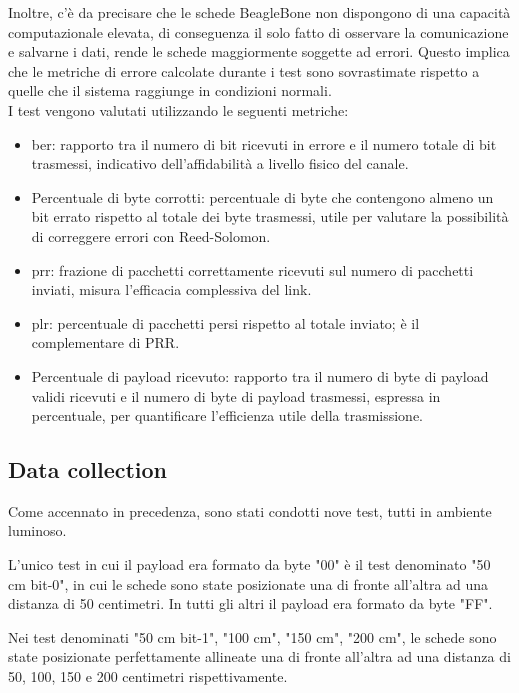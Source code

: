Inoltre, c'è da precisare che le schede BeagleBone non dispongono di una capacità computazionale elevata, di conseguenza il solo fatto di osservare la comunicazione e salvarne i dati, rende le schede maggiormente soggette ad errori. Questo implica che le metriche di errore calcolate durante i test sono sovrastimate rispetto a quelle che il sistema raggiunge in condizioni normali.\\

\noindent I test vengono valutati utilizzando le seguenti metriche:
\begin{itemize}
    \item \gls{ber}\glsfirstoccur: rapporto tra il numero di bit ricevuti in errore e il numero totale di bit trasmessi, indicativo dell’affidabilità a livello fisico del canale.
    \item Percentuale di byte corrotti: percentuale di byte che contengono almeno un bit errato rispetto al totale dei byte trasmessi, utile per valutare la possibilità di correggere errori con Reed-Solomon.
    \item \gls{prr}\glsfirstoccur: frazione di pacchetti correttamente ricevuti sul numero di pacchetti inviati, misura l’efficacia complessiva del link.
    \item \gls{plr}\glsfirstoccur: percentuale di pacchetti persi rispetto al totale inviato; è il complementare di PRR.
    \item Percentuale di payload ricevuto: rapporto tra il numero di byte di payload validi ricevuti e il numero di byte di payload trasmessi, espressa in percentuale, per quantificare l’efficienza utile della trasmissione.
\end{itemize}

\subsection{Data collection}
Come accennato in precedenza, sono stati condotti nove test, tutti in ambiente luminoso.

L'unico test in cui il payload era formato da byte "00" è il test denominato "50 cm bit-0", in cui le schede sono state posizionate una di fronte all'altra ad una distanza di 50 centimetri. In tutti gli altri il payload era formato da byte "FF".

Nei test denominati "50 cm bit-1", "100 cm", "150 cm", "200 cm", le schede sono state posizionate perfettamente allineate una di fronte all'altra ad una distanza di 50, 100, 150 e 200 centimetri rispettivamente.


